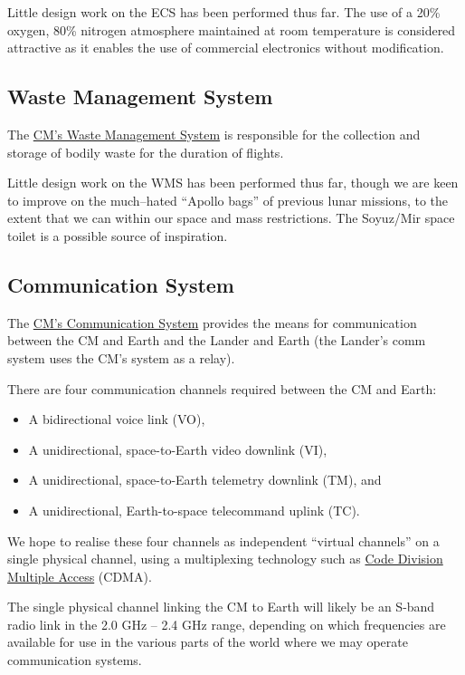 \documentclass{report}
\begin{document}
Little design work on the ECS has been performed thus far.  The use of a 20\% oxygen, 80\% nitrogen atmosphere maintained at room temperature is considered attractive as it enables the use of commercial electronics without modification.

\subsection{Waste Management System}

The \href{http://cstart.org/wiki/CLLARE_Waste_Management_System}{CM's Waste Management System} is responsible for the collection and storage of bodily waste for the duration of flights.

Little design work on the WMS has been performed thus far, though we are keen to improve on the much--hated ``Apollo bags'' of previous lunar missions, to the extent that we can within our space and mass restrictions.  The Soyuz/Mir space toilet is a possible source of inspiration.

\subsection{Communication System}

The \href{http://cstart.org/wiki/CLLARE_CM_Communication_System}{CM's Communication System} provides the means for communication between the CM and Earth and the Lander and Earth (the Lander's comm system uses the CM's system as a relay).

There are four communication channels required between the CM and Earth:
\begin{itemize}
\item A bidirectional voice link (VO),
\item A unidirectional, space-to-Earth video downlink (VI),
\item A unidirectional, space-to-Earth telemetry downlink (TM), and
\item A unidirectional, Earth-to-space telecommand uplink (TC).
\end{itemize}
We hope to realise these four channels as independent ``virtual channels'' on a single physical channel, using a multiplexing technology such as \href{http://en.wikipedia.org/wiki/Code_division_multiple_access}{Code Division Multiple Access} (CDMA).

The single physical channel linking the CM to Earth will likely be an S-band radio link in the 2.0 GHz -- 2.4 GHz range, depending on which frequencies are available for use in the various parts of the world where we may operate communication systems.
\end{document}
